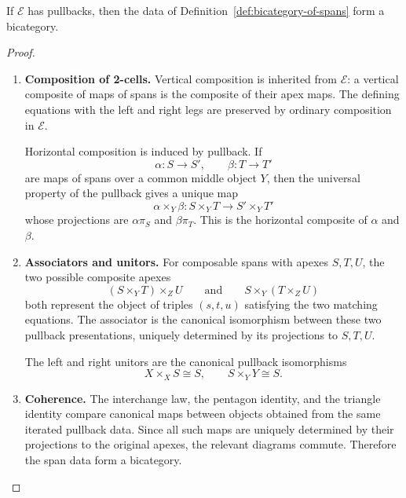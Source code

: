\begin{proposition}
\label{prop:span-is-bicategory}
    If \(\mathcal E\) has pullbacks, then the data of Definition~\ref{def:bicategory-of-spans} form a bicategory.
\end{proposition}
\begin{proof}
    \leavevmode
    \begin{enumerate}
        \item \textbf{Composition of 2-cells.} Vertical composition is inherited from \(\mathcal E\): a vertical composite of maps of spans is the composite of their apex maps. The defining equations with the left and right legs are preserved by ordinary composition in \(\mathcal E\).

        Horizontal composition is induced by pullback. If
        \[
            \alpha:S\to S',
            \qquad
            \beta:T\to T'
        \]
        are maps of spans over a common middle object \(Y\), then the universal property of the pullback gives a unique map
        \[
            \alpha\times_Y\beta:S\times_YT\to S'\times_YT'
        \]
        whose projections are \(\alpha\pi_S\) and \(\beta\pi_T\). This is the horizontal composite of \(\alpha\) and \(\beta\).

        \item \textbf{Associators and unitors.}
        For composable spans with apexes \(S,T,U\), the two possible composite apexes
        \[
            (S\times_YT)\times_ZU
            \qquad\text{and}\qquad
            S\times_Y(T\times_ZU)
        \]
        both represent the object of triples \((s,t,u)\) satisfying the two matching equations. The associator is the canonical isomorphism between these two pullback presentations, uniquely determined by its projections to \(S,T,U\).

        The left and right unitors are the canonical pullback isomorphisms
        \[
            X\times_XS\cong S,
            \qquad
            S\times_YY\cong S.
        \]

        \item \textbf{Coherence.} The interchange law, the pentagon identity, and the triangle identity compare canonical maps between objects obtained from the same iterated pullback data. Since all such maps are uniquely determined by their projections to the original apexes, the relevant diagrams commute. Therefore the span data form a bicategory.
    \end{enumerate}
\end{proof}

